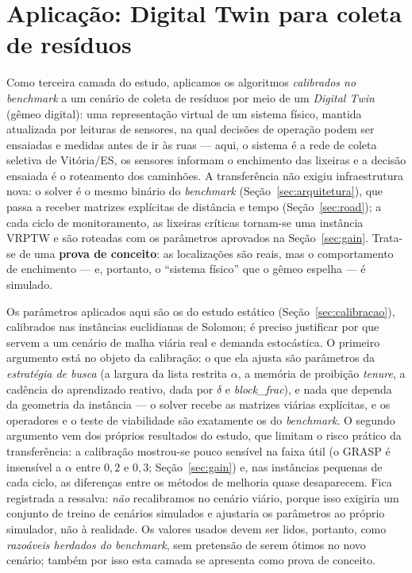 \documentclass[12pt, a4paper]{article}
\begin{document}


\section{Aplicação: Digital Twin para coleta de resíduos}\label{sec:twin}

Como terceira camada do estudo, aplicamos os algoritmos \emph{calibrados no benchmark} a um cenário de coleta de resíduos por meio de um \textit{Digital Twin} (gêmeo digital): uma representação virtual de um sistema físico, mantida atualizada por leituras de sensores, na qual decisões de operação podem ser ensaiadas e medidas antes de ir às ruas \citep{barth2023data} --- aqui, o sistema é a rede de coleta seletiva de Vitória/ES, os sensores informam o enchimento das lixeiras e a decisão ensaiada é o roteamento dos caminhões. A transferência não exigiu infraestrutura nova: o solver é o mesmo binário do \textit{benchmark} (Seção~\ref{sec:arquitetura}), que passa a receber matrizes explícitas de distância e tempo (Seção~\ref{sec:road}); a cada ciclo de monitoramento, as lixeiras críticas tornam-se uma instância VRPTW e são roteadas com os parâmetros aprovados na Seção~\ref{sec:gain}. Trata-se de uma \textbf{prova de conceito}: as localizações são reais, mas o comportamento de enchimento --- e, portanto, o ``sistema físico'' que o gêmeo espelha --- é simulado.

Os parâmetros aplicados aqui são os do estudo estático (Seção~\ref{sec:calibracao}), calibrados nas instâncias euclidianas de Solomon; é preciso justificar por que servem a um cenário de malha viária real e demanda estocástica. O primeiro argumento está no objeto da calibração: o que ela ajusta são parâmetros da \emph{estratégia de busca} (a largura da lista restrita $\alpha$, a memória de proibição \textit{tenure}, a cadência do aprendizado reativo, dada por $\delta$ e \textit{block\_frac}), e nada que dependa da geometria da instância --- o solver recebe as matrizes viárias explícitas, e os operadores e o teste de viabilidade são exatamente os do \textit{benchmark}. O segundo argumento vem dos próprios resultados do estudo, que limitam o risco prático da transferência: a calibração mostrou-se pouco sensível na faixa útil (o GRASP é insensível a $\alpha$ entre $0{,}2$ e $0{,}3$; Seção~\ref{sec:gain}) e, nas instâncias pequenas de cada ciclo, as diferenças entre os métodos de melhoria quase desaparecem. Fica registrada a ressalva: \emph{não} recalibramos no cenário viário, porque isso exigiria um conjunto de treino de cenários simulados e ajustaria os parâmetros ao próprio simulador, não à realidade. Os valores usados devem ser lidos, portanto, como \emph{razoáveis herdados do benchmark}, sem pretensão de serem ótimos no novo cenário; também por isso esta camada se apresenta como prova de conceito.
\end{document}
